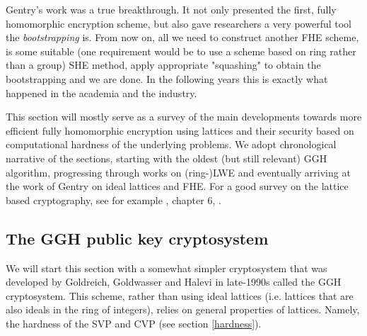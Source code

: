 Gentry's work was a true breakthrough. It not only presented the first, fully homomorphic encryption scheme, but also gave researchers a very powerful tool the \textit{bootstrapping} is. From now on, all we need to construct another FHE scheme, is some suitable (one requirement would be to use a scheme based on ring rather than a group) SHE method, apply appropriate "squashing" to obtain the bootstrapping and we are done. In the following years this is exactly what happened in the academia and the industry.

This section will mostly serve as a survey of the main developments towards more efficient fully homomorphic encryption using lattices and their security based on computational hardness of the underlying problems. We adopt chronological narrative of the sections, starting with the oldest (but still relevant) GGH algorithm, progressing through works on (ring-)LWE and eventually arriving at the work of Gentry \cite{gentry_phd} on ideal lattices and FHE. For a good survey on the lattice based cryptography, see for example \cite{two_faces}, \cite{book} chapter 6, \cite{lattice-survey}.

\subsection{The GGH public key cryptosystem}
We will start this section with a somewhat simpler cryptosystem that was developed by Goldreich, Goldwasser and Halevi in late-1990s \cite{ggh} called the GGH cryptosystem. This scheme, rather than using ideal lattices (i.e. lattices that are also ideals in the ring of integers), relies on general properties of lattices. Namely, the hardness of the SVP and CVP (see section \ref{hardness}).

